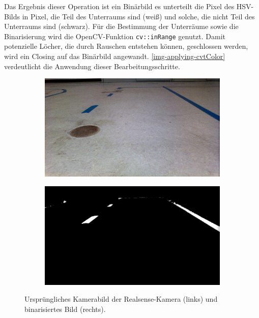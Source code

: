 \documentclass[a4paper,12pt]{report}
\begin{document}
	Das Ergebnis dieser Operation ist ein Binärbild es unterteilt die Pixel des HSV-Bilds in Pixel, die Teil des Unterraums sind (weiß) und solche, die nicht Teil des Unterraums sind (schwarz).
	Für die Bestimmung der Unterräume sowie die Binarisierung wird die OpenCV-Funktion \texttt{cv::inRange} genutzt.
	Damit potenzielle Löcher, die durch Rauschen entstehen können, geschlossen werden, wird ein Closing auf das Binärbild angewandt.
	\autoref{img-applying-cvtColor} verdeutlicht die Anwendung dieser Bearbeitungsschritte.

	\begin{figure}
		\centering
		\begin{subfigure}[c]{0.45\textwidth}
			\includegraphics[width=\textwidth]{assets/Strasse.png}
		\end{subfigure}
		\begin{subfigure}[c]{0.45\textwidth}
			\includegraphics[width=\textwidth]{assets/Strasse-Binaer.png}
		\end{subfigure}
		\caption{Ursprüngliches Kamerabild der Realsense-Kamera (links) und binarisiertes Bild (rechts).}
		\label{img-applying-cvtColor}
	\end{figure}
\end{document}
